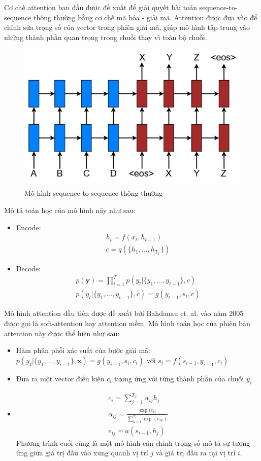 \documentclass[14pt]{extreport}
\begin{document}
Cơ chế attention ban đầu được đề xuất để giải quyết bài toán sequence-to-sequence thông thường bằng cơ chế mã hóa - giải mã. Attention được đưa vào để chỉnh sửa trọng số của vector trong phiên giải mã, giúp mô hình tập trung vào những thành phần quan trọng trong chuỗi thay vì toàn bộ chuỗi.
\begin{figure}
    \centering
    \includegraphics{image/luong_et_al.PNG}
    \caption{Mô hình sequence-to-sequence thông thường}
    \label{fig:luong_attention}
\end{figure}
Mô tả toán học của mô hình này như sau:
\begin{itemize}
    \item Encode:
\begin{align}
    h_{t}= f(x_{t}, h_{t-1})\\
    c= q(\{h_{1},...,h_{T_{x}}\})
\end{align}
    \item Decode:
\begin{align}
    p(\textbf{y})= \prod_{t=1}^{T} p(y_{t}|\{y_{1},..., y_{t-1}\}, c)\\
    p(y_{t}|\{y_{1},..., y_{t-1}\}, c)= g(y_{t-1}, s_{t}, c)
\end{align}
\end{itemize}
Mô hình attention đầu tiên được đề xuất bởi Bahdanau et. al. vào năm 2005 được gọi là soft-attention hay attention mềm. Mô hình toán học của phiên bản attention này được thể hiện như sau:
\begin{itemize}
    \item Hàm phân phỗi xác suất của bước giải mã: $p(y_{I}|\{y_{1},..., y_{i-1}\}, \textbf{x})=  g(y_{i-1}, s_{i}, c_{i})$
     với $s_{i}= f(s_{i-1}, y_{i-1}, c_{i})$
     \item Đưa ra một vector điều kiện $c_{i}$ tương ứng với từng thành phần của chuỗi $y_{i}$
     \item 
     \begin{align}
         c_{i}= \sum_{j=1}^{T_{x}}\alpha_{ij}h_{j}\\
         \alpha_{ij}= \frac{\exp (e_{ij}}{\sum_{k=1}^{T_{x}}\exp(e_{ik})}\\
         e_{ij}= a(s_{i-1}, h_{j})
     \end{align}
     Phương trình cuối cùng là một mô hình căn chỉnh trọng số mô tả sự tương ứng giữa giá trị đầu vào xung quanh vị trí $j$ và giá trị đầu ra tại vị trí $i$.
\end{itemize}
\end{document}
